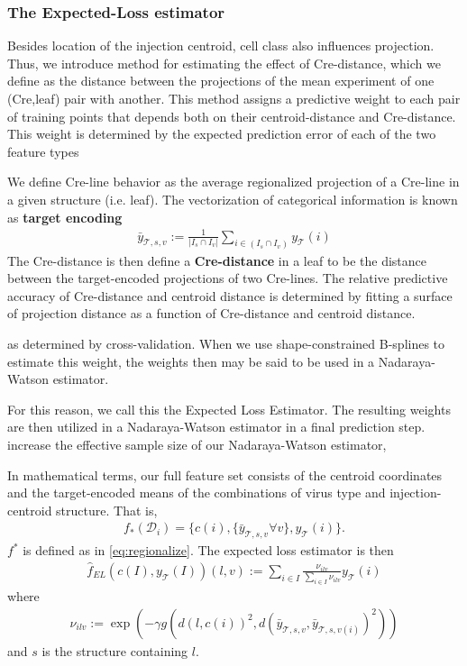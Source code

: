 \newpage
\subsubsection{The Expected-Loss estimator}

\label{supp_sec:el}

Besides location of the injection centroid, cell class also influences projection.
Thus, we introduce method for estimating the effect of Cre-distance, which we define as the distance between the projections of the mean experiment of one (Cre,leaf) pair with another.
This method assigns a predictive weight to each pair of training points that depends both on their centroid-distance and Cre-distance.
This weight is determined by the expected prediction error of each of the two feature types

We define Cre-line behavior as the average regionalized projection of a Cre-line in a given structure (i.e. leaf).
The vectorization of categorical information is known as \textbf{target encoding} 
\begin{eqnarray*}
\bar y_{\mathcal T,s,v} := \frac{1}{|I_s \cap I_v|}  \sum_{i \in (I_s \cap I_v)} y_{\mathcal T}(i)
\end{eqnarray*}
The Cre-distance is then define a \textbf{Cre-distance} in a leaf to be the distance between the target-encoded projections of two Cre-lines.
The relative predictive accuracy of Cre-distance and centroid distance is determined by fitting a surface of projection distance as a function of Cre-distance and centroid distance. 

 as determined by cross-validation.
When we use shape-constrained B-splines to estimate this weight, the weights then may be said to be used in a Nadaraya-Watson estimator.


For this reason, we call this the Expected Loss Estimator.
The resulting weights are then utilized in a Nadaraya-Watson estimator in a final prediction step.
increase the effective sample size of our Nadaraya-Watson estimator,


In mathematical terms, our full feature set consists of the centroid coordinates and the target-encoded means of the combinations of virus type and injection-centroid structure.
That is, 
\begin{eqnarray*}
f_*({\mathcal D}_i) = \{c(i) , \{\bar y_{\mathcal T,s,v}  \forall v \}, y_{\mathcal T}(i) \}.
\end{eqnarray*}
$f^*$ is defined as in \eqref{eq:regionalize}.
The expected loss estimator is then 
\begin{eqnarray*}
\hat f_{EL} ( c(I),y_{\mathcal T} (I))(l,v) :=  \sum_{i \in I} \frac{ \nu_{ilv} }{\sum_{i \in I}  \nu_{ilv}  } y_{\mathcal T}(i)
\end{eqnarray*}
where
\begin{eqnarray*}
\nu_{ilv} := \exp (- \gamma g( d(l, c(i))^2, d(\bar y_{\mathcal T,s,v} , \bar y_{\mathcal T,s,v(i)}  )^2))
\end{eqnarray*}
and $s$ is the structure containing $l$.

